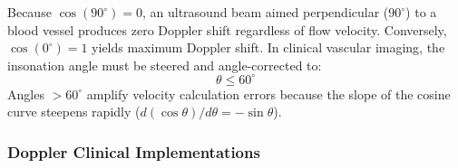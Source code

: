 \documentclass[11pt,a4paper]{article}
\begin{document}
\begin{physicsoverview}
Because $\cos(90^\circ) = 0$, an ultrasound beam aimed perpendicular ($90^\circ$) to a blood vessel produces zero Doppler shift regardless of flow velocity. Conversely, $\cos(0^\circ) = 1$ yields maximum Doppler shift. In clinical vascular imaging, the insonation angle must be steered and angle-corrected to:
\begin{equation}
    \theta \le 60^\circ
\end{equation}
Angles $>60^\circ$ amplify velocity calculation errors because the slope of the cosine curve steepens rapidly ($d(\cos\theta)/d\theta = -\sin\theta$).
\end{physicsoverview}

\subsubsection{Doppler Clinical Implementations}
\end{document}
